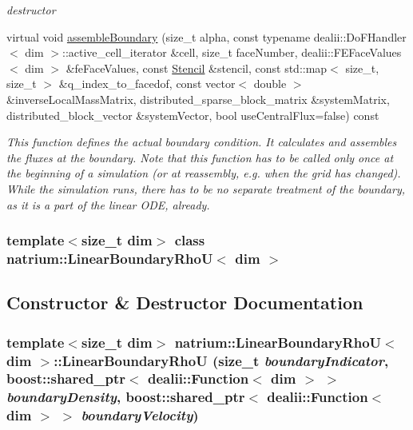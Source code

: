 \begin{DoxyCompactItemize}
\begin{DoxyCompactList}\small\item\em destructor \item\end{DoxyCompactList}\item 
virtual void \hyperlink{classnatrium_1_1LinearBoundaryRhoU_a5e8291245a4d0a81ed8a7545e0ffbe96}{assembleBoundary} (size\_\-t alpha, const typename dealii::DoFHandler$<$ dim $>$::active\_\-cell\_\-iterator \&cell, size\_\-t faceNumber, dealii::FEFaceValues$<$ dim $>$ \&feFaceValues, const \hyperlink{classnatrium_1_1Stencil}{Stencil} \&stencil, const std::map$<$ size\_\-t, size\_\-t $>$ \&q\_\-index\_\-to\_\-facedof, const vector$<$ double $>$ \&inverseLocalMassMatrix, distributed\_\-sparse\_\-block\_\-matrix \&systemMatrix, distributed\_\-block\_\-vector \&systemVector, bool useCentralFlux=false) const 
\begin{DoxyCompactList}\small\item\em This function defines the actual boundary condition. It calculates and assembles the fluxes at the boundary. Note that this function has to be called only once at the beginning of a simulation (or at reassembly, e.g. when the grid has changed). While the simulation runs, there has to be no separate treatment of the boundary, as it is a part of the linear ODE, already. \item\end{DoxyCompactList}\end{DoxyCompactItemize}
\subsubsection*{template$<$size\_\-t dim$>$ class natrium::LinearBoundaryRhoU$<$ dim $>$}



\subsection{Constructor \& Destructor Documentation}
\hypertarget{classnatrium_1_1LinearBoundaryRhoU_a14a9b89c500915afd7945ff151e16b7a}{
\subsubsection[{LinearBoundaryRhoU}]{\setlength{\rightskip}{0pt plus 5cm}template$<$size\_\-t dim$>$ {\bf natrium::LinearBoundaryRhoU}$<$ dim $>$::{\bf LinearBoundaryRhoU} (size\_\-t {\em boundaryIndicator}, \/  boost::shared\_\-ptr$<$ dealii::Function$<$ dim $>$ $>$ {\em boundaryDensity}, \/  boost::shared\_\-ptr$<$ dealii::Function$<$ dim $>$ $>$ {\em boundaryVelocity})}}
\label{classnatrium_1_1LinearBoundaryRhoU_a14a9b89c500915afd7945ff151e16b7a}


